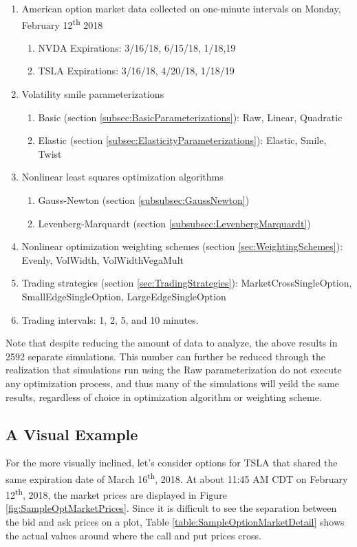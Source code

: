 \documentclass[12pt, a4paper, notitlepage]{article}
\numberwithin{equation}{subsection}
\numberwithin{figure}{subsection}
\numberwithin{table}{subsection}
\begin{document}
\begin{enumerate}
    \item American option market data collected on one-minute intervals on Monday, February 12\textsuperscript{th} 2018
    \begin{enumerate}
        \item NVDA Expirations:  3/16/18, 6/15/18, 1/18,19
        \item TSLA Expirations:  3/16/18, 4/20/18, 1/18/19
    \end{enumerate}
    \item Volatility smile parameterizations
    \begin{enumerate}
        \item Basic (section \ref{subsec:BasicParameterizations}):  Raw, Linear, Quadratic
        \item Elastic (section \ref{subsec:ElasticityParameterizations}): Elastic, Smile, Twist
    \end{enumerate}
    \item Nonlinear least squares optimization algorithms
    \begin{enumerate}
        \item Gauss-Newton (section \ref{subsubsec:GaussNewton})
        \item Levenberg-Marquardt (section \ref{subsubsec:LevenbergMarquardt})
    \end{enumerate}
    \item Nonlinear optimization weighting schemes (section \ref{sec:WeightingSchemes}): Evenly, VolWidth, VolWidthVegaMult
    \item Trading strategies (section \ref{sec:TradingStrategies}):  MarketCrossSingleOption, SmallEdgeSingleOption, LargeEdgeSingleOption
    \item Trading intervals:  1, 2, 5, and 10 minutes.
\end{enumerate}
Note that despite reducing the amount of data to analyze, the above results in 2592 separate simulations.  This number can further be reduced through the realization that simulations run using the Raw parameterization do not execute any optimization process, and thus many of the simulations will yeild the same results, regardless of choice in optimization algorithm or weighting scheme.

\subsection{A Visual Example}
For the more visually inclined, let's consider options for TSLA that shared the same expiration date of March 16\textsuperscript{th}, 2018.  At about 11:45 AM CDT on February 12\textsuperscript{th}, 2018, the market prices are displayed in Figure \ref{fig:SampleOptMarketPrices}.  Since it is difficult to see the separation between the bid and ask prices on a plot, Table \ref{table:SampleOptionMarketDetail} shows the actual values around where the call and put prices cross. 
\end{document}

